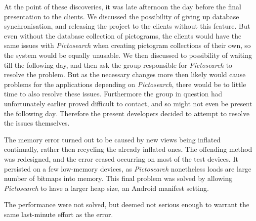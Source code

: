 At the point of these discoveries, it was late afternoon the day before the final presentation to the clients. We discussed the possibility of giving up database synchronisation, and releasing the project to the clients without this feature. But even without the database collection of pictograms, the clients would have the same issues with \textit{Pictosearch} when creating pictogram collections of their own, so the system would be equally unusable. We then discussed to possibility of waiting till the following day, and then ask the group responsible for \textit{Pictosearch} to resolve the problem. But as the necessary changes more then likely would cause problems for the applications depending on \textit{Pictosearch}, there would be to little time to also resolve these issues. Furthermore the group in question had unfortunately earlier proved difficult to contact, and so might not even be present the following day. 
Therefore the present developers decided to attempt to resolve the issues themselves. 

The memory error turned out to be caused by new views being inflated continually, rather then recycling the already inflated ones. The offending method was redesigned, and the error ceased occurring on most of the test devices. It persisted on a few low-memory devices, as \textit{Pictosearch} nonetheless loads are large number of bitmaps into memory. This final problem was solved by allowing \textit{Pictosearch} to have a larger heap size, an Android manifest setting.

The performance were not solved, but deemed not serious enough to warrant the same last-minute effort as the error.
